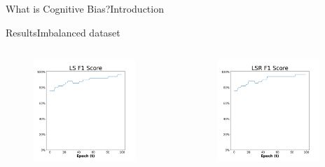 \documentclass[
	aspectratio=169,	%
	onlytextwidth,		%
	t,					%
	]{beamer}
\begin{document}
\begin{frame}[fragile]{What is Cognitive Bias?}{Introduction}
\begin{frame}[fragile]{Results}{Imbalanced dataset}
\begin{columns}
			\begin{column}[T]{0.33\textwidth}
				\begin{figure}
					\includegraphics[width=0.9\textwidth]{myfigs/LS_i_res.png}
				\end{figure}
			\end{column}
		
			\begin{column}[T]{0.33\textwidth}
				\begin{figure}
					\includegraphics[width=0.9\textwidth]{myfigs/LSR_i_res.png}
				\end{figure}
			\end{column}
		

\end{columns}
\end{frame}
\end{frame}
\end{document}
